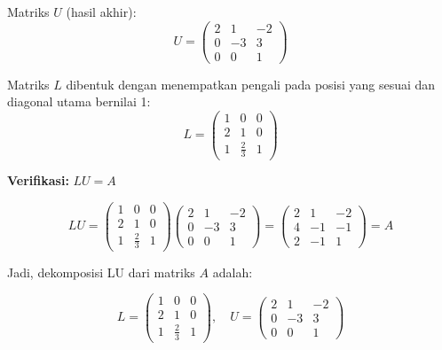 \documentclass{article}
\begin{document}
Matriks $ U $ (hasil akhir):
\[
U = 
\begin{pmatrix}
2 & 1 & -2 \\
0 & -3 & 3 \\
0 & 0 & 1
\end{pmatrix}
\]

Matriks $ L $ dibentuk dengan menempatkan pengali pada posisi yang sesuai dan diagonal utama bernilai 1:
\[
L = 
\begin{pmatrix}
1 & 0 & 0 \\
2 & 1 & 0 \\
1 & \frac{2}{3} & 1
\end{pmatrix}
\]

\textbf{Verifikasi:} $ LU = A $

\[
LU = 
\begin{pmatrix}
1 & 0 & 0 \\
2 & 1 & 0 \\
1 & \frac{2}{3} & 1
\end{pmatrix}
\begin{pmatrix}
2 & 1 & -2 \\
0 & -3 & 3 \\
0 & 0 & 1
\end{pmatrix}
=
\begin{pmatrix}
2 & 1 & -2 \\
4 & -1 & -1 \\
2 & -1 & 1
\end{pmatrix}
= A
\]

Jadi, dekomposisi LU dari matriks $ A $ adalah:

\[
\boxed{
L = 
\begin{pmatrix}
1 & 0 & 0 \\
2 & 1 & 0 \\
1 & \frac{2}{3} & 1
\end{pmatrix},
\quad
U = 
\begin{pmatrix}
2 & 1 & -2 \\
0 & -3 & 3 \\
0 & 0 & 1
\end{pmatrix}
}
\]
\end{document}
